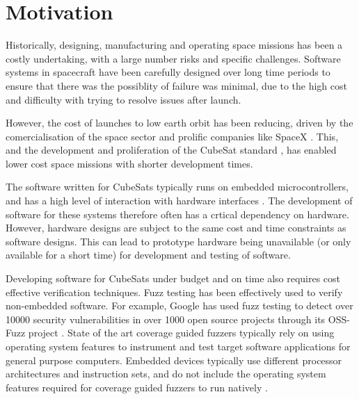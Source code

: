 \documentclass[../report.tex]{subfiles}
\begin{document}
\section{Motivation} \label{sec:motivation}



Historically, designing, manufacturing and operating space missions has been a
costly undertaking, with a large number risks and specific challenges. Software
systems in spacecraft have been carefully designed over long time periods to
ensure that there was the possiblity of failure was minimal, due to the high
cost and difficulty with trying to resolve issues after launch.

However, the cost of launches to low earth orbit has been reducing, driven by
the comercialisation of the space sector and prolific companies like SpaceX
\citep{Denis_2020}. This, and the development and proliferation of the CubeSat
standard \citep{CubesatDesignSpec}, has enabled lower cost space missions with
shorter development times.

The software written for CubeSats typically runs on embedded microcontrollers,
and has a high level of interaction with hardware interfaces
\citep{Cratere_2024}. The development of software for these systems therefore
often has a crtical dependency on hardware. However, hardware designs are
subject to the same cost and time constraints as software designs. This can
lead to prototype hardware being unavailable (or only available for a short
time) for development and testing of software.

Developing software for CubeSats under budget and on time also requires cost
effective verification techniques. Fuzz testing has been effectively used to
verify non-embedded software. For example, Google has used fuzz testing to
detect over 10000 security vulnerabilities in over 1000 open source projects
through its OSS-Fuzz project \citep{Google_2023}. State of the art coverage
guided fuzzers typically rely on using operating system features to instrument
and test target software applications for general purpose computers. Embedded
devices typically use different processor architectures and instruction sets,
and do not include the operating system features required for coverage guided
fuzzers to run natively \citep{Muench_2018}.
\end{document}
